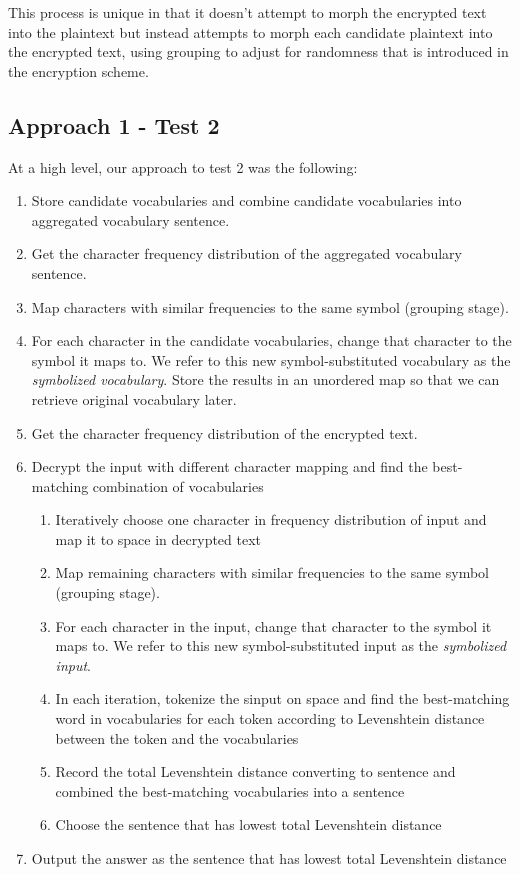 \documentclass[12pt]{article}
\begin{document}
This process is unique in that it doesn't attempt to morph the encrypted text into the plaintext but instead attempts to morph each candidate plaintext into the encrypted text, using grouping to adjust for randomness that is introduced in the encryption scheme.

\subsection{Approach 1 - Test 2}
At a high level, our approach to test 2 was the following:
\begin{enumerate}

    \item Store candidate vocabularies and combine candidate vocabularies into aggregated vocabulary sentence.
    \item Get the character frequency distribution of the aggregated vocabulary sentence.
    \item Map characters with similar frequencies to the same symbol (grouping stage).
    \item For each character in the candidate vocabularies, change that character to the symbol it maps to. We refer to this new symbol-substituted vocabulary as the \emph{symbolized vocabulary}. Store the results in an unordered map so that we can retrieve original vocabulary later.
    \item Get the character frequency distribution of the encrypted text.
    \item Decrypt the input with different character mapping and find the best-matching combination of vocabularies
    \begin{enumerate}
        \item Iteratively choose one character in frequency distribution of input and map it to space in decrypted text
        \item Map remaining characters with similar frequencies to the same symbol (grouping stage).
        \item For each character in the input, change that character to the symbol it maps to. We refer to this new symbol-substituted input as the \emph{symbolized input}.
        \item In each iteration, tokenize the sinput on space and find the best-matching word in vocabularies for each token according to Levenshtein distance between the token and the vocabularies
        \item Record the total Levenshtein distance converting to sentence and combined the best-matching vocabularies into a sentence
        \item Choose the sentence that has lowest total Levenshtein distance
    \end{enumerate}
    \item Output the answer as the sentence that has lowest total Levenshtein distance

\end{enumerate}
\end{document}
